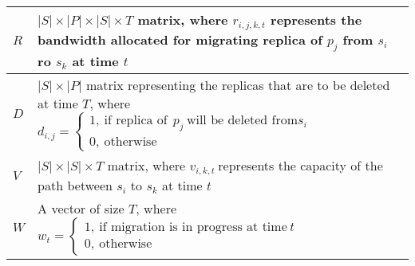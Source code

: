\begin{table}[!htb]
\begin{tabular}{|p{22pt}|p{208pt}|}
{$R$

} & \parbox{208pt}{\raggedright 

$\left\vert{}S\right\vert{}\times{}\left\vert{}P\right\vert{}\times{}\left\vert{}S\right\vert{}\times{}T$ matrix, where $r_{i,j,k,t}$ represents the bandwidth allocated for migrating replica of $p_j$ from $s_i$ ro $s_k$ at time $t$
} \\
\hline
\parbox{22pt}{\raggedright 

$D$

} & \parbox{208pt}{\raggedright 


$\left\vert{}S\right\vert{}\times{}\left\vert{}P\right\vert{}$ matrix representing the replicas that are to be deleted at time $T$, where 
$d_{i,j}=\left\{\begin{array}{l}1,\ \mbox{if replica of}\ \ p_j\ \mbox{will be deleted from} s_i\ 
\\
0,\ \mbox{otherwise}\end{array}\right.$
} \\
\hline
\parbox{22pt}{\raggedright 

$V$

} & \parbox{208pt}{\raggedright 

$\left\vert{}S\right\vert{}\times{}\left\vert{}S\right\vert{}\times{}T$
matrix, where $v_{i,k,t}\ $represents the capacity of the path between $s_i$ to
$s_k$ at time $t$
} \\
\hline
\parbox{22pt}{\raggedright 

$W$

} & \parbox{208pt}{\raggedright 
A vector of size $T$, where $w_t=\left\{\begin{array}{l}1,\ \mbox{if migration is
in progress at time}\ t\  \\
0,\ \mbox{otherwise}\end{array}\right.$
} \\
\hline
\end{tabular}
\end{table}
